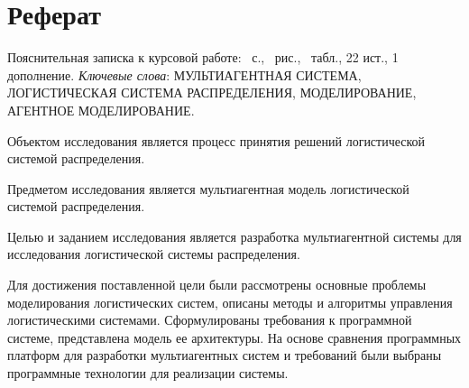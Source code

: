 \Russian
\section*{Реферат}
Пояснительная записка к курсовой работе: \pageref{LastPage}~с., \totalfigures~рис., \totaltables~табл., 22 ист., 1 дополнение. \bigbreak
\textit{Ключевые слова}: \MakeUppercase{мультиагентная система, логистическая система распределения, моделирование, агентное моделирование}. \bigbreak

Объектом исследования является процесс принятия решений логистической системой распределения.

Предметом исследования является мультиагентная модель  логистической системой распределения. 

Целью и заданием исследования является разработка мультиагентной системы для исследования логистической системы распределения.

Для достижения поставленной цели были рассмотрены основные проблемы моделирования логистических систем, описаны методы и алгоритмы управления логистическими системами.
Сформулированы требования к программной системе, представлена модель ее архитектуры.
На основе сравнения программных платформ для разработки мультиагентных систем и требований были выбраны программные технологии для реализации системы. 

\Ukrainian
